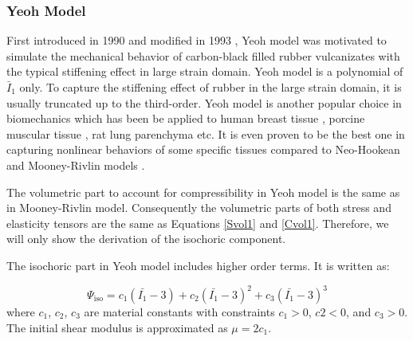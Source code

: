 %
\subsubsection{Yeoh Model}
First introduced in 1990 \cite{Yeoh} and modified in 1993 \cite{Yeoh2}, Yeoh model was motivated to simulate the mechanical behavior of carbon-black filled rubber vulcanizates with the typical stiffening effect in large strain domain. Yeoh model is a polynomial of $\bar{I}_1$ only.  To capture the stiffening effect of rubber in the large strain domain, it is usually truncated up to the third-order. Yeoh model is another popular choice in biomechanics which has been be applied to human breast tissue \cite{OHagen}, porcine muscular tissue \cite{Bols2}, rat lung parenchyma \cite{Wall, Wall2} etc. It is even proven to be the best one in capturing nonlinear behaviors of some specific tissues compared to Neo-Hookean and Mooney-Rivlin models \cite{Zaeimdar}.

The volumetric part to account for compressibility in Yeoh model is the same as in Mooney-Rivlin model. Consequently the volumetric parts of both stress and elasticity tensors are the same as Equations \ref{Svol1} and \ref{Cvol1}. Therefore, we will only show the derivation of the isochoric component.

The isochoric part in Yeoh model includes higher order terms. It is written as:

\begin{equation} \label{iso2}
\Psi_\mathrm{iso} = c_1(\bar{I_1} - 3) + c_2(\bar{I_1} - 3)^2 + c_3(\bar{I_1} - 3)^3
\end{equation}
where $c_1$, $c_2$, $c_3$ are material constants with constraints $c_1 > 0$, $c2 < 0$, and $c_3 > 0$. The initial shear modulus is approximated as $\mu = 2c_1$.

